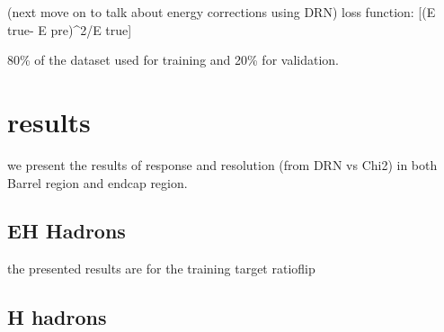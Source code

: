 (next move on to talk about energy corrections using DRN) loss function:  [(E true- E pre)^2/E true]

80\% of the dataset used for training and 20\% for validation.

\section{results}
we present the results of response and resolution (from DRN vs Chi2) in  both Barrel region and endcap region.

\subsection{EH Hadrons}
the presented results are for the training target ratioflip





\subsection{H hadrons}




